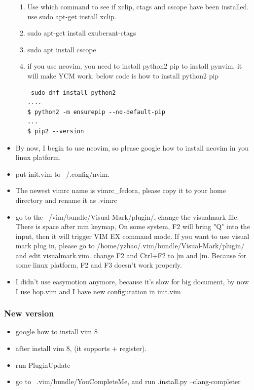 \documentclass[a4paper,11pt,twoside]{book}
\begin{document}
\begin{itemize}
\begin{enumerate}
		\item Use which command to see if xclip, ctags and cscope have been installed. use sudo apt-get install xclip.  

		\item sudo apt-get install exuberant-ctags

        \item sudo apt install cscope

        \item if you use neovim, you need to install python2 pip to install pynvim, it will make YCM work. below code is how to install python2 pip
\begin{verbatim}
 sudo dnf install python2
....
$ python2 -m ensurepip --no-default-pip
...
$ pip2 --version
\end{verbatim}	
		
\end{enumerate}
        \item By now, I begin to use neovim, so please google how to install neovim in you linux platform.
        \item put init.vim to ~/.config/nvim.
        \item The newest vimrc name is vimrc\_fedora, please copy it to your home directory and rename it as .vimrc

		\item go to the  ~/vim/bundle/Visual-Mark/plugin/, change the visualmark file. There is space after mm keymap,  On some system, F2 will bring "Q" into the input, then it will trigger VIM EX command mode.  If you want to use visual mark plug in, please go to /home/yzhao/.vim/bundle/Visual-Mark/plugin/ and edit visualmark.vim. change F2 and Ctrl+F2 to [m and ]m. Because for some linux platform, F2 and F3 doesn't work properly.

        \item I didn't use easymotion anymore, because it's slow for big document, by now I use hop.vim and I have new configuration in init.vim

\end{itemize}

\subsubsection{New version}

\begin{itemize}
		\item google how to install vim 8
		\item after install vim 8, (it supports + register).
		\item run PluginUpdate
		\item go to ~.vim/bundle/YouCompleteMe, and run .install.py --clang-completer
\end{itemize}
\end{document}
